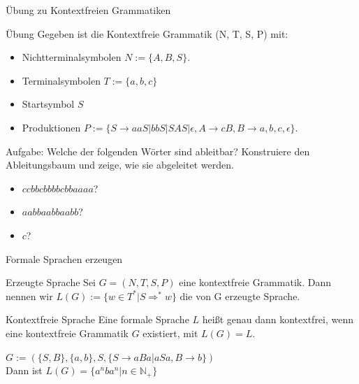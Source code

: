 \begin{frame}{Übung zu Kontextfreien Grammatiken}
	\begin{taskblock}{Übung}
		Gegeben ist die Kontextfreie Grammatik (N, T, S, P) mit:
		
		\begin{itemize}
			\item Nichtterminalsymbolen $N := \{A, B, S\}$.
			\item Terminalsymbolen $T := \{a, b, c\}$
			\item Startsymbol $S$
			\item Produktionen $P := \{S \rightarrow aaS | bbS | SAS | \epsilon, A \rightarrow cB , B \rightarrow a, b, c, \epsilon\}$.
		\end{itemize}
	
		\bp
	
		Aufgabe: Welche der folgenden Wörter sind ableitbar? Konstruiere den Ableitungsbaum und zeige, wie sie abgeleitet werden.
		
		\begin{itemize}
			\item $ccbbcbbbbcbbaaaa$? %
			\item $aabbaabbaabb$? %
			\item $c$?
		\end{itemize}
	\end{taskblock}
\end{frame}

\begin{frame}{Formale Sprachen erzeugen}
	\bp\begin{block}{Erzeugte Sprache}
		Sei $G = (N, T, S, P)$ eine kontextfreie Grammatik. \ip Dann nennen wir $L(G) := \{w \in T^*| S \Rightarrow^* w\}$ die von G erzeugte Sprache.
	\end{block}

	\bp
	
	\begin{block}{Kontextfreie Sprache}
		Eine formale Sprache $L$ heißt genau dann kontextfrei, wenn eine kontextfreie Grammatik $G$ existiert, mit $L(G) = L$.
	\end{block}

	\bp

	$G:= (\{S,B\}, \{a,b\}, S, \{S \rightarrow aBa|aSa, B \rightarrow b\})$\\\vspace{.3cm}
	\ip Dann ist $L(G) = \{a^nba^n|n \in \mathbb{N_+}\}$
\end{frame}

